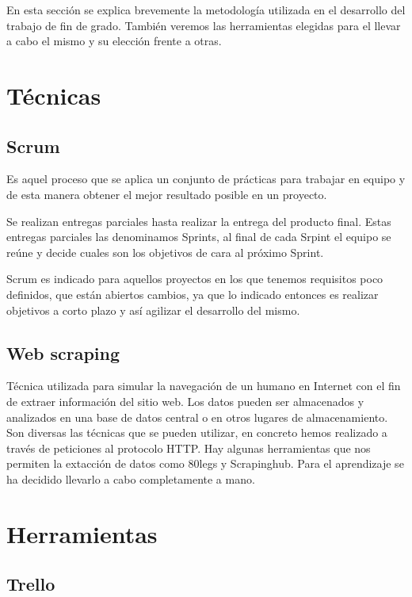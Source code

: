 

En esta sección se explica brevemente la metodología utilizada en el desarrollo del trabajo de fin de grado. También veremos las herramientas elegidas para el llevar a cabo el mismo y su elección frente a otras.

\section{Técnicas}

\subsection{Scrum} 
Es aquel proceso que se aplica un conjunto de prácticas para trabajar en equipo y de esta manera obtener el mejor resultado posible en un proyecto.

Se realizan entregas parciales hasta realizar la entrega del producto final. Estas entregas parciales las denominamos Sprints, al final de cada Srpint el equipo se reúne y decide cuales son los objetivos de cara al próximo Sprint.

Scrum es indicado para aquellos proyectos en los que  tenemos requisitos poco definidos, que están abiertos cambios, ya que lo indicado entonces es realizar objetivos a corto plazo y así  agilizar el desarrollo del mismo.

\subsection{Web scraping}

Técnica utilizada para simular  la navegación de un humano en Internet con el fin de extraer información del sitio web. Los datos pueden ser almacenados y analizados en una base de datos central o en otros lugares de almacenamiento.  Son diversas las técnicas que se pueden utilizar, en concreto hemos realizado a través de peticiones al protocolo HTTP. Hay algunas herramientas que nos permiten la extacción de datos como 80legs y Scrapinghub. Para el aprendizaje se ha decidido llevarlo a cabo completamente a mano.

\section{Herramientas}

\subsection{Trello}

